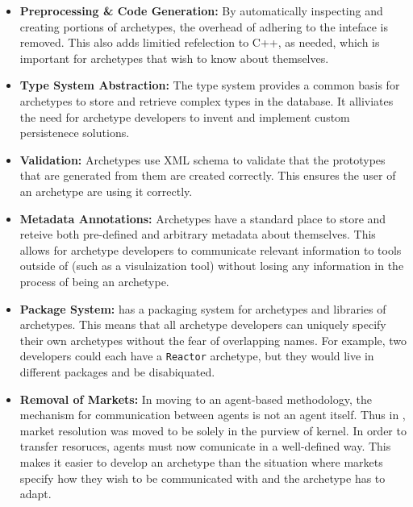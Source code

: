 \begin{itemize}
    \item \textbf{Preprocessing \& Code Generation:}  By automatically 
        inspecting and creating portions of archetypes, the overhead
        of adhering to the \cyclus inteface is removed. This also 
        adds limitied refelection to C++, as needed, which is important 
        for archetypes that wish to know about themselves.

    \item \textbf{Type System Abstraction:} The \Cyclus type system 
        provides a common basis for archetypes to store and retrieve 
        complex types in the database. It alliviates the need for archetype
        developers to invent and implement custom persistenece solutions.

    \item \textbf{Validation:} Archetypes use XML schema to validate that 
        the prototypes that are generated from them are created correctly.
        This ensures the user of an archetype are using it correctly.

    \item \textbf{Metadata Annotations:} Archetypes have a standard place to 
        store and reteive both pre-defined and arbitrary metadata about themselves.
        This allows for archetype developers to communicate relevant information
        to tools outside of \cyclus (such as a visulaization tool) without
        losing any information in the process of being an archetype.

    \item \textbf{Package System:} \Cyclus has a packaging system for archetypes and 
        libraries of archetypes. This means that all archetype developers can 
        uniquely specify their own archetypes without the fear of overlapping 
        names.  For example, two developers could each have a \texttt{Reactor}
        archetype, but they would live in different packages and be 
        disabiquated.

    \item \textbf{Removal of Markets:} In moving to an agent-based methodology, 
        the mechanism for communication between agents is not an agent itself.
        Thus in \cyclus, market resolution was moved to be solely in the purview 
        of kernel. In order to transfer resoruces, agents must now comunicate 
        in a well-defined way. This makes it easier to develop an archetype than 
        the situation where markets specify how they wish to be communicated with 
        and the archetype has to adapt. 

\end{itemize}

